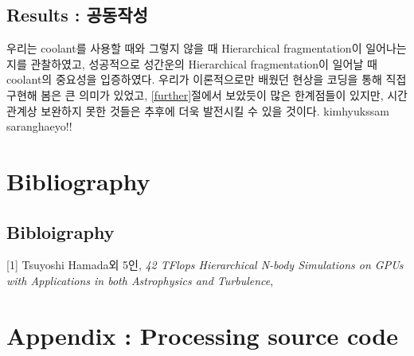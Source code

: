\documentclass{gshs-hutech}
\begin{document}
\section{Results : 공동작성}
우리는 coolant를 사용할 때와 그렇지 않을 때 Hierarchical fragmentation이 일어나는지를 관찰하였고, 성공적으로 성간운의 Hierarchical fragmentation이 일어날 때 coolant의 중요성을 입증하였다. 우리가 이론적으로만 배웠던 현상을 코딩을 통해 직접 구현해 봄은 큰 의미가 있었고, \ref{further}절에서 보았듯이 많은 한계점들이 있지만, 시간관계상 보완하지 못한 것들은 추후에 더욱 발전시킬 수 있을 것이다. kimhyukssam saranghaeyo!!

\chapter{Bibliography}
\section{Bibloigraphy}
[1] Tsuyoshi Hamada외 5인, {\em42 TFlops Hierarchical N-body Simulations on GPUs with Applications in both Astrophysics and Turbulence}, \label{bib1}

\chapter{Appendix : Processing source code} \label{appendix}
\end{document}
